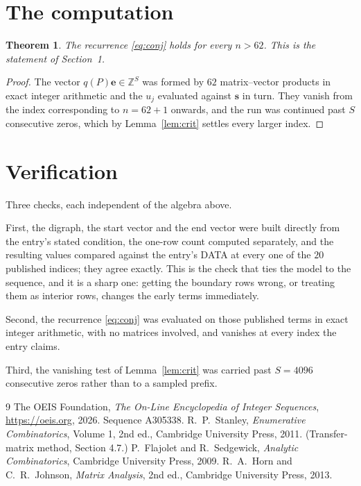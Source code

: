 \documentclass[11pt,a4paper]{article}
\theoremstyle{plain}
\newtheorem{theorem}{Theorem}
\theoremstyle{definition}
\begin{document}
\section{The computation}

\begin{theorem}
The recurrence \eqref{eq:conj} holds for every $n>62$. This is the statement of
Section~1.
\end{theorem}

\begin{proof}
The vector $q(P)\mathbf{e}\in\mathbb{Z}^{S}$ was formed by $62$ matrix--vector
products in exact integer arithmetic and the $u_j$ evaluated against $\mathbf{s}$ in turn.
They vanish from the index corresponding to $n=62+1$ onwards, and the run was continued
past $S$ consecutive zeros, which by Lemma~\ref{lem:crit} settles every larger index.
\end{proof}

\section{Verification}

Three checks, each independent of the algebra above.

First, the digraph, the start vector and the end vector were built directly from the
entry's stated condition, the one-row count computed separately, and the resulting values
compared against the entry's DATA at every one of the $20$ published indices; they
agree exactly. This is the check that ties the model to the sequence, and it is a sharp one:
getting the boundary rows wrong, or treating them as interior rows, changes the early terms
immediately.

Second, the recurrence \eqref{eq:conj} was evaluated on those published terms in exact
integer arithmetic, with no matrices involved, and vanishes at every index the entry claims.

Third, the vanishing test of Lemma~\ref{lem:crit} was carried past $S=4096$ consecutive
zeros rather than to a sampled prefix.

\begin{thebibliography}{9}
 The OEIS Foundation, \emph{The On-Line Encyclopedia of Integer
Sequences}, \url{https://oeis.org}, 2026. Sequence A305338.
 R.~P.~Stanley, \emph{Enumerative Combinatorics}, Volume 1, 2nd ed.,
Cambridge University Press, 2011. (Transfer-matrix method, Section 4.7.)
 P.~Flajolet and R.~Sedgewick, \emph{Analytic Combinatorics}, Cambridge
University Press, 2009.
 R.~A.~Horn and C.~R.~Johnson, \emph{Matrix Analysis}, 2nd ed., Cambridge
University Press, 2013.
\end{thebibliography}
\end{document}
